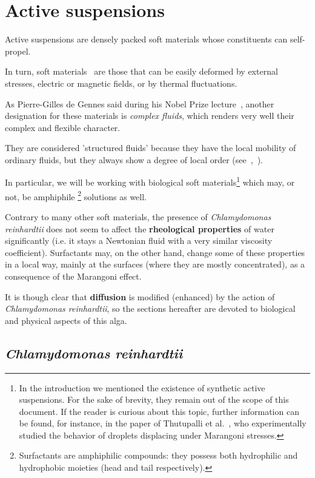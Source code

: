 \section{Active suspensions}
\label{active_suspensions}

Active suspensions are densely packed soft materials whose constituents can self-propel.

In turn, soft materials~\cite{Soft_materials} are those that can be easily deformed by external stresses, electric or magnetic fields, or by thermal fluctuations. 

As Pierre-Gilles de Gennes said during his Nobel Prize lecture~\cite{PGG}, another designation for these materials is \textit{complex fluids}, which renders very well their complex and flexible character.

They are considered 'structured fluids' because they have the local mobility of ordinary fluids, but they always show a degree of local order (see~\cite{soft_matter},~\cite{Hamley}).

In particular, we will be working with biological soft materials\footnote{In the introduction we mentioned the existence of synthetic active suspensions. For the sake of brevity, they remain out of the scope of this document. If the reader is curious about this topic, further information can be found, for instance, in the paper of Thutupalli et al.~\cite{Thutupalli}, who experimentally studied the behavior of droplets displacing under Marangoni stresses.} which may, or not, be amphiphile \footnote{Surfactants are amphiphilic compounds: they possess both hydrophilic and hydrophobic moieties (head and tail respectively).} solutions as well.

Contrary to many other soft materials, the presence of \textit{Chlamydomonas reinhardtii} does not seem to affect the \textbf{rheological properties} of water significantly (i.e. it stays a Newtonian fluid with a very similar viscosity coefficient). Surfactants may, on the other hand, change some of these properties in a local way, mainly at the surfaces (where they are mostly concentrated), as a consequence of the Marangoni effect.

It is though clear that \textbf{diffusion} is modified (enhanced) by the action of \textit{Chlamydomonas reinhardtii}, so the sections hereafter are devoted to biological and physical aspects of this alga.

\subsection{\textit{Chlamydomonas reinhardtii}}

